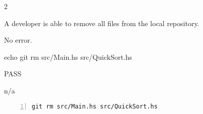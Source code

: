 \begin{description}[align=right,leftmargin=3.2cm,labelindent=3.0cm]
\item[Step:] 2
\item[Confirm:] A developer is able to remove all files from the local repository.
\item[Expectation:] No error.
\item[Command:] echo git  rm src/Main.hs src/QuickSort.hs
\item[Test Result:] PASS
\item[Evidence:] n/a
\end{description}
\begin{lstlisting}[numbers=left]
git rm src/Main.hs src/QuickSort.hs

\end{lstlisting}
